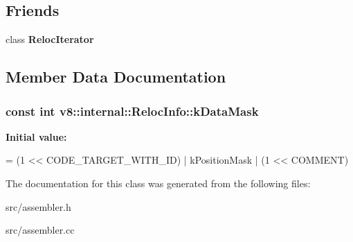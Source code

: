 \subsection*{Friends}
\begin{DoxyCompactItemize}
\item 
\hypertarget{classv8_1_1internal_1_1_reloc_info_a9ff673d9f08f4ce3738760e4e66dc88a}{}class {\bfseries Reloc\+Iterator}\label{classv8_1_1internal_1_1_reloc_info_a9ff673d9f08f4ce3738760e4e66dc88a}

\end{DoxyCompactItemize}


\subsection{Member Data Documentation}
\hypertarget{classv8_1_1internal_1_1_reloc_info_a81087f9aba7b7a2a529d3c166093fb61}{}
\subsubsection[{k\+Data\+Mask}]{\setlength{\rightskip}{0pt plus 5cm}const int v8\+::internal\+::\+Reloc\+Info\+::k\+Data\+Mask\hspace{0.3cm}{\ttfamily [static]}}\label{classv8_1_1internal_1_1_reloc_info_a81087f9aba7b7a2a529d3c166093fb61}
{\bfseries Initial value\+:}
\begin{DoxyCode}
=
      (1 << CODE\_TARGET\_WITH\_ID) | kPositionMask | (1 << COMMENT)
\end{DoxyCode}


The documentation for this class was generated from the following files\+:\begin{DoxyCompactItemize}
\item 
src/assembler.\+h\item 
src/assembler.\+cc\end{DoxyCompactItemize}
